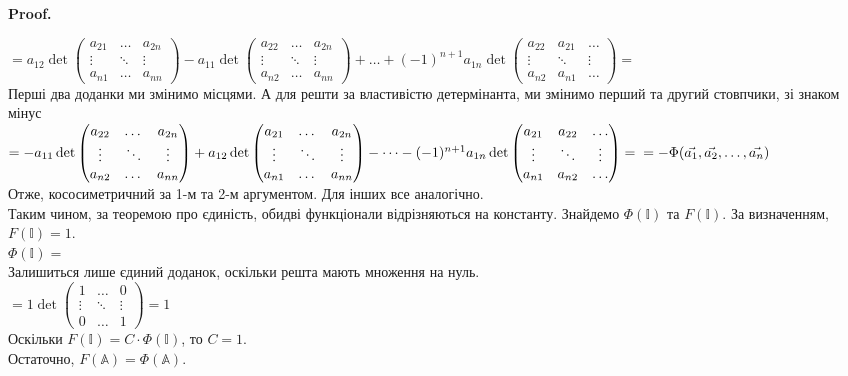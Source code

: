 \documentclass[a4paper, 10pt]{article}
\makeatletter
\theoremstyle{theoremdd}
\renewenvironment{proof}[1][Proof.\\]{\par
\pushQED{\hfill \qed}%
\normalfont \topsep6\p@\@plus6\p@\relax
\trivlist
\item\relax
{\bfseries
#1\@addpunct{.}}\hspace\labelsep\ignorespaces
}{%
\popQED\endtrivlist\@endpefalse
}
\makeatother
\begin{document}
\begin{proof}
$= a_{12} \det \begin{pmatrix} a_{21} & \dots & a_{2n} \\ \vdots & \ddots & \vdots \\ a_{n1} & \dots & a_{nn} \end{pmatrix} - a_{11} \det \begin{pmatrix} a_{22} & \dots & a_{2n} \\ \vdots & \ddots & \vdots \\ a_{n2} & \dots & a_{nn} \end{pmatrix} + \dots + (-1)^{n+1} a_{1n} \det \begin{pmatrix} a_{22} & a_{21} & \dots \\ \vdots & \ddots & \vdots \\ a_{n2} & a_{n1} & \dots \end{pmatrix} = $\\
Перші два доданки ми змінимо місцями. А для решти за властивістю детермінанта, ми змінимо перший та другий стовпчики, зі знаком мінус\\
$= - a_{11} \det \begin{pmatrix} a_{22} & \dots & a_{2n} \\ \vdots & \ddots & \vdots \\ a_{n2} & \dots & a_{nn} \end{pmatrix} + a_{12} \det \begin{pmatrix} a_{21} & \dots & a_{2n} \\ \vdots & \ddots & \vdots \\ a_{n1} & \dots & a_{nn} \end{pmatrix} - \dots - (-1)^{n+1} a_{1n} \det \begin{pmatrix} a_{21} & a_{22} & \dots \\ \vdots & \ddots & \vdots \\ a_{n1} & a_{n2} & \dots \end{pmatrix} = \\ = -\Phi(\vec{a_1},\vec{a_2},\dots,\vec{a_n})$\\
Отже, кососиметричний за 1-м та 2-м аргументом. Для інших все аналогічно.
\bigskip \\
Таким чином, за теоремою про єдиність, обидві функціонали відрізняються на константу. Знайдемо $\Phi(\mathbb{I})$ та $F(\mathbb{I})$. За визначенням, $F(\mathbb{I}) = 1$.\\
$\Phi(\mathbb{I}) =$\\
Залишиться лише єдиний доданок, оскільки решта мають множення на нуль.\\
$= 1 \det \begin{pmatrix} 1 & \dots & 0 \\ \vdots & \ddots & \vdots \\ 0 & \dots & 1 \end{pmatrix} = 1$\\
Оскільки $F(\mathbb{I}) = C\cdot \Phi(\mathbb{I})$, то $C = 1$.\\
Остаточно, $F(\mathbb{A}) = \Phi(\mathbb{A})$.
\end{proof}
\end{document}
